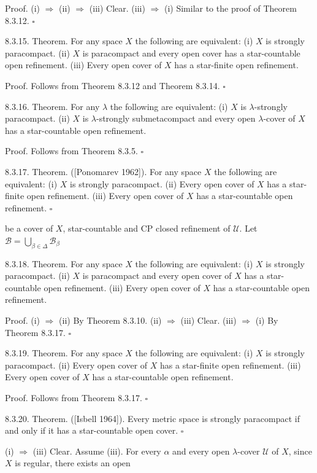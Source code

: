 \documentclass[jiang8iv.tex]{subfiles}
\begin{document}
Proof. (i) \(\Rightarrow\) (ii) \(\Rightarrow\) (iii) Clear.
(iii) \(\Rightarrow\) (i) Similar to the proof of Theorem 8.3.12. \(\square\)

8.3.15. Theorem. For any space \(X\) the following are equivalent:
(i) \(X\) is strongly paracompact.
(ii) \(X\) is paracompact and every open cover has a star-countable open refinement.
(iii) Every open cover of \(X\) has a star-finite open refinement.

Proof. Follows from Theorem 8.3.12 and Theorem 8.3.14. \(\square\)

8.3.16. Theorem. For any \(\lambda\) the following are equivalent:
(i) \(X\) is \(\lambda\)-strongly paracompact.
(ii) \(X\) is \(\lambda\)-strongly submetacompact and every open \(\lambda\)-cover of \(X\) has a star-countable open refinement.

Proof. Follows from Theorem 8.3.5. \(\square\)

8.3.17. Theorem. ([Ponomarev 1962]). For any space \(X\) the following are equivalent:
(i) \(X\) is strongly paracompact.
(ii) Every open cover of \(X\) has a star-finite open refinement.
(iii) Every open cover of \(X\) has a star-countable open refinement. \(\square\)


be a cover of \(X\), star-countable and CP closed refinement of \(\mathscr{U}\). Let \(\mathscr{B}=\bigcup_{\beta\in\Delta}\mathscr{B}_\beta\)

8.3.18. Theorem. For any space \(X\) the following are equivalent:
(i) \(X\) is strongly paracompact.
(ii) \(X\) is paracompact and every open cover of \(X\) has a star-countable open refinement.
(iii) Every open cover of \(X\) has a star-countable open refinement.

Proof. (i) \(\Rightarrow\) (ii) By Theorem 8.3.10.
(ii) \(\Rightarrow\) (iii) Clear.
(iii) \(\Rightarrow\) (i) By Theorem 8.3.17. \(\square\)

8.3.19. Theorem. For any space \(X\) the following are equivalent:
(i) \(X\) is strongly paracompact.
(ii) Every open cover of \(X\) has a star-finite open refinement.
(iii) Every open cover of \(X\) has a star-countable open refinement.

Proof. Follows from Theorem 8.3.17. \(\square\)

8.3.20. Theorem. ([Isbell 1964]). Every metric space is strongly paracompact if and only if it has a star-countable open cover. \(\square\)


(i) \(\Rightarrow\) (iii) Clear. Assume (iii). For every \(\alpha\) and every open \(\lambda\)-cover \(\mathscr{U}\) of \(X\), since \(X\) is regular, there exists an open
\end{document}

